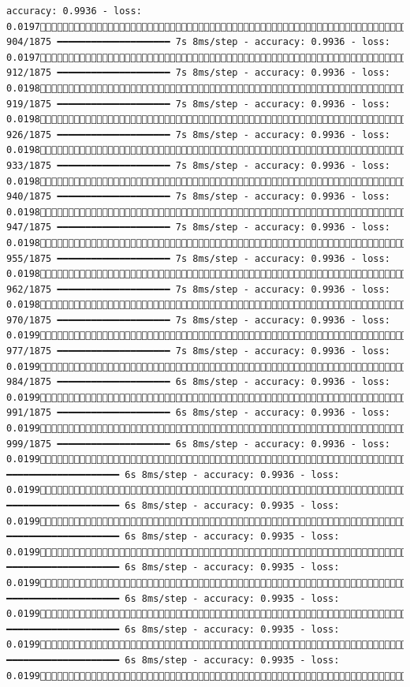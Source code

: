 \documentclass[
  letterpaper,
  DIV=11,
  numbers=noendperiod]{scrreprt}
\begin{document}
\begin{verbatim}
accuracy: 0.9936 - loss: 0.0197 904/1875 ━━━━━━━━━━━━━━━━━━━━ 7s 8ms/step - accuracy: 0.9936 - loss: 0.0197 912/1875 ━━━━━━━━━━━━━━━━━━━━ 7s 8ms/step - accuracy: 0.9936 - loss: 0.0198 919/1875 ━━━━━━━━━━━━━━━━━━━━ 7s 8ms/step - accuracy: 0.9936 - loss: 0.0198 926/1875 ━━━━━━━━━━━━━━━━━━━━ 7s 8ms/step - accuracy: 0.9936 - loss: 0.0198 933/1875 ━━━━━━━━━━━━━━━━━━━━ 7s 8ms/step - accuracy: 0.9936 - loss: 0.0198 940/1875 ━━━━━━━━━━━━━━━━━━━━ 7s 8ms/step - accuracy: 0.9936 - loss: 0.0198 947/1875 ━━━━━━━━━━━━━━━━━━━━ 7s 8ms/step - accuracy: 0.9936 - loss: 0.0198 955/1875 ━━━━━━━━━━━━━━━━━━━━ 7s 8ms/step - accuracy: 0.9936 - loss: 0.0198 962/1875 ━━━━━━━━━━━━━━━━━━━━ 7s 8ms/step - accuracy: 0.9936 - loss: 0.0198 970/1875 ━━━━━━━━━━━━━━━━━━━━ 7s 8ms/step - accuracy: 0.9936 - loss: 0.0199 977/1875 ━━━━━━━━━━━━━━━━━━━━ 7s 8ms/step - accuracy: 0.9936 - loss: 0.0199 984/1875 ━━━━━━━━━━━━━━━━━━━━ 6s 8ms/step - accuracy: 0.9936 - loss: 0.0199 991/1875 ━━━━━━━━━━━━━━━━━━━━ 6s 8ms/step - accuracy: 0.9936 - loss: 0.0199 999/1875 ━━━━━━━━━━━━━━━━━━━━ 6s 8ms/step - accuracy: 0.9936 - loss: 0.01991006/1875 ━━━━━━━━━━━━━━━━━━━━ 6s 8ms/step - accuracy: 0.9936 - loss: 0.01991013/1875 ━━━━━━━━━━━━━━━━━━━━ 6s 8ms/step - accuracy: 0.9935 - loss: 0.01991021/1875 ━━━━━━━━━━━━━━━━━━━━ 6s 8ms/step - accuracy: 0.9935 - loss: 0.01991028/1875 ━━━━━━━━━━━━━━━━━━━━ 6s 8ms/step - accuracy: 0.9935 - loss: 0.01991035/1875 ━━━━━━━━━━━━━━━━━━━━ 6s 8ms/step - accuracy: 0.9935 - loss: 0.01991042/1875 ━━━━━━━━━━━━━━━━━━━━ 6s 8ms/step - accuracy: 0.9935 - loss: 0.01991049/1875 ━━━━━━━━━━━━━━━━━━━━ 6s 8ms/step - accuracy: 0.9935 - loss: 0.01991057/1875 
\end{verbatim}
\end{document}
